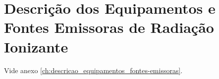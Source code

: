 \chapter{Descrição dos Equipamentos e Fontes Emissoras de Radiação Ionizante}
Vide anexo \ref{ch:descricao_equipamentos_fontes-emissoras}.